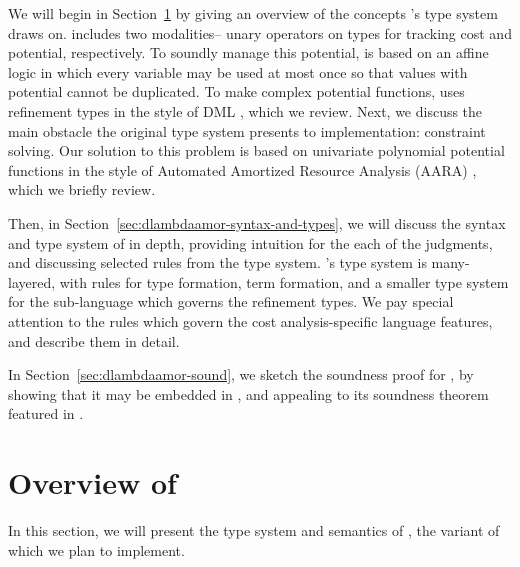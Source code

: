 We will begin in Section~\ref{sec:lambdaamor-overview} by giving an overview of the concepts \lambdaamorminus's type system draws on. \lambdaamorminus includes two modalities-- unary operators on types for tracking cost and potential, respectively. To soundly manage this potential, \lambdaamorminus is based on an affine logic in which every variable may be used at most once so that values with potential cannot be duplicated. To make complex potential functions, \lambdaamor uses refinement types in the style of DML \citehere, which we review. Next, we discuss the main obstacle the original type system presents to implementation: constraint solving. Our solution to this problem is based on univariate polynomial potential functions in the style of Automated Amortized Resource Analysis (AARA) \citehere, which we briefly review.

Then, in Section~\ref{sec:dlambdaamor-syntax-and-types}, we will discuss the syntax and type system of \dlambdaamor in depth, providing intuition for the each of the judgments, and discussing selected rules from the type system. \dlambdaamor's type system is many-layered, with rules for type formation, term formation, and a smaller type system for the sub-language which governs the refinement types. We pay special attention to the rules which govern the cost analysis-specific language features, and describe them in detail.

In Section~\ref{sec:dlambdaamor-sound}, we sketch the soundness proof for \dlambdaamor, by showing that it may be embedded in \lambdaamorminus, and appealing to its soundness theorem featured in \citet{rajani-et-al:popl21}.




\section{Overview of \dlambdaamor} 
\label{sec:lambdaamor-overview}
In this section, we will present the type system and semantics of \dlambdaamor, the variant of \lambdaamor which we plan to implement.

